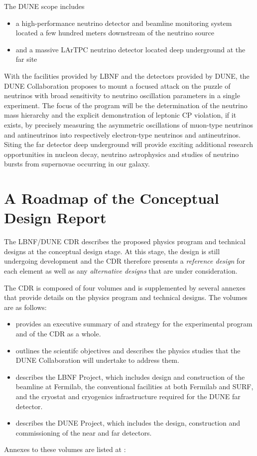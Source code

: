 The DUNE scope includes
\begin{itemize}
\item a high-performance neutrino detector and beamline monitoring system
located a few hundred meters downstream of the neutrino source
\item and a massive LArTPC neutrino detector located deep underground at
  the far site
\end{itemize}

With the facilities provided by LBNF and the detectors
provided by DUNE, the DUNE Collaboration proposes to mount a focused
attack on the puzzle of neutrinos with broad sensitivity to neutrino
oscillation parameters in a single experiment.  The focus of the
program will be the determination of the neutrino mass hierarchy and the explicit demonstration of leptonic CP violation,
if it exists, by precisely measuring the asymmetric oscillations of
muon-type neutrinos and antineutrinos into respectively electron-type neutrinos and
antineutrinos.  Siting the far detector deep underground will provide
exciting additional research opportunities in nucleon decay, neutrino
astrophysics and studies of neutrino bursts from supernovae occurring
in our galaxy.

\section{A Roadmap of the Conceptual Design Report}

The LBNF/DUNE CDR describes the proposed physics program and 
technical designs at the conceptual design stage.  At this stage, the design is
still undergoing development and the CDR therefore presents a \textit{reference design} for each element as well as any 
\textit{alternative designs} that are under consideration.

The CDR is composed of four volumes and is supplemented
by several annexes that provide details on the physics program and technical designs. The volumes are as follows:

\begin{itemize}
\item \volintro provides an executive summary of and strategy for the experimental program and of the CDR as a whole.
\item \volphys outlines the scientifc objectives and describes the physics studies that the DUNE Collaboration will undertake to address them.
\item \vollbnf describes the LBNF Project, which includes design and construction of the beamline at Fermilab, the conventional facilities at both Fermilab and SURF, and the cryostat and cryogenics infrastructure required for the DUNE far detector.
\item \voldune describes the DUNE Project, which includes the design, construction and commissioning of the near and far detectors. 
\end{itemize}
Annexes to these volumes are listed at :


